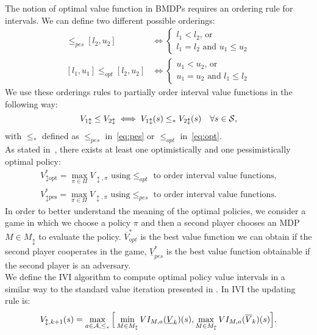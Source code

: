 \newline
The notion of optimal value function in \ac{BMDP}s requires an ordering rule for intervals. We can define two different possible orderings:
\begin{align}
[l_1, u_1] \leq_{pes} [l_2, u_2] &\Leftrightarrow 
\begin{cases}
l_1 < l_2 \text{, or }\\
l_1 = l_2 \text{ and } u_1 \leq u_2
\end{cases} \label{eq:pes}\\
[l_1, u_1] \leq_{opt} [l_2, u_2] &\Leftrightarrow 
\begin{cases}
u_1 < u_2 \text{, or }\\
u_1 = u_2 \text{ and } l_1 \leq l_2
\end{cases} \label{eq:opt}
\end{align}
We use these orderings rules to partially order interval value functions in the following way:
$$V_{1 \updownarrow} \leq V_{2 \updownarrow} \iff V_{1 \updownarrow}(s) \leq_{*} V_{2 \updownarrow}(s) \quad \forall s \in \mathcal{S},$$
with $\leq_{*}$ defined as $\leq_{pes}$ in~\eqref{eq:pes} or $\leq_{opt}$ in~\eqref{eq:opt}.\\
\newline
As stated in~\citep{givan2000bounded}, there exists at least one optimistically and one pessimistically optimal policy:
\begin{align*}
V^{*}_{\updownarrow \text{opt}} = \max_{\pi \in \Pi} V_{\updownarrow, \pi} \text{ using} \leq_{opt} \text{ to order interval value functions,}\\
V^{*}_{\updownarrow \text{pes}} = \max_{\pi \in \Pi} V_{\updownarrow, \pi} \text{ using} \leq_{pes} \text{ to order interval value functions.}
\end{align*}
In order to better understand the meaning of the optimal policies, we consider a game in which we choose a policy $\pi$ and then a second player chooses an \ac{MDP} $M \in M_{\updownarrow}$ to evaluate the policy. $\overline{V}^{*}_{opt}$ is the best value function we can obtain if the second player cooperates in the game, $\underline{V}^{*}_{pes}$ is the best value function obtainable if the second player is an adversary.\\
\newline
We define the \acf{IVI} algorithm to compute optimal policy value intervals in a similar way to the standard value iteration presented in . In \ac{IVI} the updating rule is:
\begin{align}
V_{\updownarrow, k+1}(s) = \max_{a \in \mathcal{A}, \leq_{*}} \Big[ \min_{M \in M_{\updownarrow}} VI_{M, a}(\underline{V}_{k})(s), \max_{M \in M_{\updownarrow}} VI_{M, a}(\overline{V}_{k})(s) \Big]. \label{eq:ivi}
\end{align}

